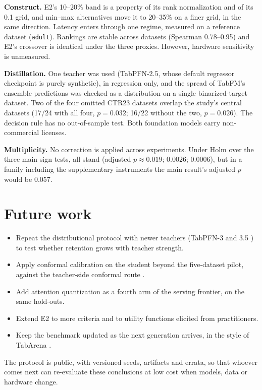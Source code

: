 \textbf{Construct.} E2's 10--20\% band is a property of its rank normalization and of its 0.1 grid, and min--max alternatives move it to 20--35\% on a finer grid, in the same direction. Latency enters through one regime, measured on a
reference dataset (\texttt{adult}). Rankings are stable across
datasets (Spearman 0.78--0.95) and E2's crossover is identical under
the three proxies. However, hardware sensitivity is unmeasured.

\textbf{Distillation.} One teacher was used (TabPFN-2.5, whose
default regressor checkpoint is purely synthetic), in regression
only, and the spread of TabFM's ensemble predictions was
checked as a distribution on a single binarized-target dataset. Two
of the four omitted CTR23 datasets overlap the study's central
datasets (17/24 with all four, $p=0.032$; 16/22 without the two,
$p=0.026$). The decision rule has no out-of-sample test. Both
foundation models carry non-commercial licenses.

\textbf{Multiplicity.} No correction is applied across experiments.
Under Holm over the three main sign tests, all stand (adjusted
$p \approx 0.019$; $0.0026$; $0.0006$), but in a family including
the supplementary instruments the main result's adjusted $p$ would be
0.057.

\section{Future work}
\label{sec:conc-futuros}

\begin{itemize}
  \item Repeat the distributional protocol with newer teachers
    (TabPFN-3 and 3.5 \citep{tabpfn3-2026,tabpfn35tr2026}) to test
    whether retention grows with teacher strength.
  \item Apply conformal calibration on the student beyond the
    five-dataset pilot, against the teacher-side conformal route \citep{park2026}.
  \item Add attention quantization \citep{kubler2026} as a fourth
    arm of the serving frontier, on the same hold-outs.
  \item Extend E2 to more criteria and to utility functions elicited
    from practitioners.
  \item Keep the benchmark updated as the next generation
    arrives, in the style of TabArena \citep{tabarena2025}.
\end{itemize}

The protocol is public, with versioned seeds, artifacts and errata,
so that whoever comes next can re-evaluate these conclusions at low
cost when models, data or hardware change.
